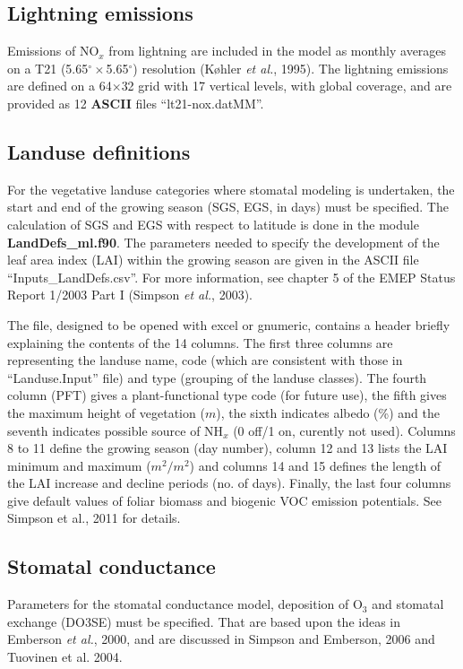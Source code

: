 \subsection{Lightning emissions}
Emissions of NO$_{x}$ from lightning are included in the model
as monthly averages on a T21 (5.65$^{\circ}\times$5.65$^{\circ}$) resolution (K{\o}hler {\sl et al.}, 1995). 
The lightning emissions are defined on a 64$\times$32 grid with 17 vertical
levels, with global coverage, and are provided as 12 {\bf ASCII} files
``lt21-nox.datMM''.



\subsection{Landuse definitions}
For the vegetative landuse categories where stomatal modeling is
undertaken, the start and end of the growing season (SGS, EGS, in days) must be specified. 
The calculation of SGS and EGS with respect to latitude is done 
in the module {\bf LandDefs\_ml.f90}. 
The parameters needed to specify the
development of the leaf area index (LAI) within the growing season
are given in the ASCII file ``Inputs\_LandDefs.csv''. 
For more information, see chapter 5  of the EMEP Status Report 1/2003 Part I (Simpson {\sl et al.}, 2003).


The file, designed to be opened with excel or gnumeric,
contains a header briefly explaining the contents of the 
14 columns. 
The first three columns are representing the landuse name, code (which
are consistent with those in ``Landuse.Input'' file) and
type (grouping of the landuse classes). The fourth column 
(PFT) gives a plant-functional type code (for future use),
 the fifth gives
the maximum height of vegetation ($m$), the sixth indicates albedo (\%) and
the seventh indicates possible source of NH$_{x}$ (0 off/1 on,
curently not used). Columns 8 to 11
define the growing season (day number), column 12 and 13 lists the
LAI minimum  and maximum ($m^{2}/m^{2}$) and 
columns 14 and 15
defines the length of the LAI increase and decline periods (no. of days).
Finally, the last four columns give default values of 
foliar biomass and biogenic VOC emission potentials. See Simpson
et al., 2011 for details.


\subsection{Stomatal conductance}
Parameters for the stomatal conductance model, deposition of O$_{3}$ and
stomatal exchange (DO3SE) must be specified. That are based upon the ideas in
Emberson {\sl et al.}, 2000, and are discussed in Simpson and Emberson,
2006 and Tuovinen et al. 2004.

